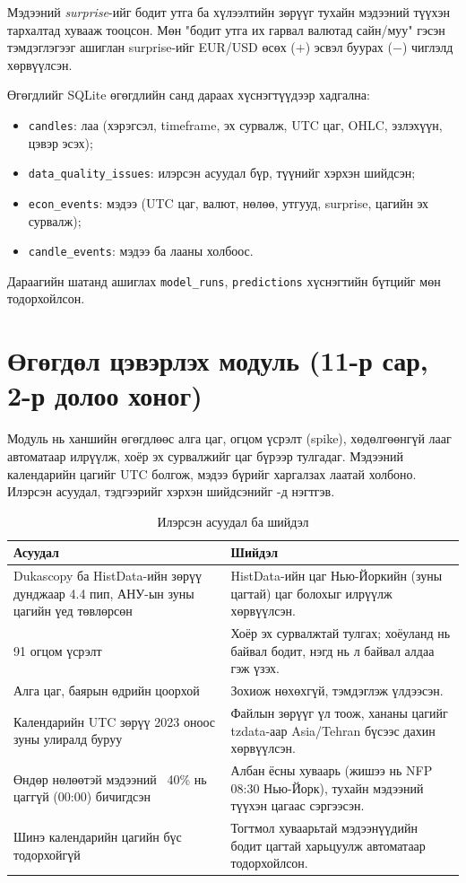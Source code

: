 Мэдээний \emph{surprise}-ийг бодит утга ба хүлээлтийн зөрүүг тухайн мэдээний түүхэн тархалтад хувааж тооцсон. Мөн
"бодит утга их гарвал валютад сайн/муу" гэсэн тэмдэглэгээг ашиглан surprise-ийг EUR/USD өсөх ($+$) эсвэл буурах
($-$) чиглэлд хөрвүүлсэн.

Өгөгдлийг SQLite өгөгдлийн санд дараах хүснэгтүүдээр хадгална:
\begin{itemize}
    \item \texttt{candles}: лаа (хэрэгсэл, timeframe, эх сурвалж, UTC цаг, OHLC, эзлэхүүн, цэвэр эсэх);
    \item \texttt{data\_quality\_issues}: илэрсэн асуудал бүр, түүнийг хэрхэн шийдсэн;
    \item \texttt{econ\_events}: мэдээ (UTC цаг, валют, нөлөө, утгууд, surprise, цагийн эх сурвалж);
    \item \texttt{candle\_events}: мэдээ ба лааны холбоос.
\end{itemize}
Дараагийн шатанд ашиглах \texttt{model\_runs}, \texttt{predictions} хүснэгтийн бүтцийг мөн тодорхойлсон.

\section{Өгөгдөл цэвэрлэх модуль (11-р сар, 2-р долоо хоног)}
Модуль нь ханшийн өгөгдлөөс алга цаг, огцом үсрэлт (spike), хөдөлгөөнгүй лааг автоматаар илрүүлж, хоёр эх сурвалжийг
цаг бүрээр тулгадаг. Мэдээний календарийн цагийг UTC болгож, мэдээ бүрийг харгалзах лаатай холбоно. Илэрсэн асуудал,
тэдгээрийг хэрхэн шийдсэнийг -д нэгтгэв.

\begin{table}[H]
\centering
\caption{Илэрсэн асуудал ба шийдэл}
\label{tab:quality}
\small
\begin{tabular}{p{5.2cm}p{7.6cm}}
\toprule
\textbf{Асуудал} & \textbf{Шийдэл} \\
\midrule
Dukascopy ба HistData-ийн зөрүү дунджаар 4.4 пип, АНУ-ын зуны цагийн үед төвлөрсөн &
HistData-ийн цаг Нью-Йоркийн (зуны цагтай) цаг болохыг илрүүлж хөрвүүлсэн. \\
91 огцом үсрэлт & Хоёр эх сурвалжтай тулгах; хоёуланд нь байвал бодит, нэгд нь л байвал алдаа гэж үзэх. \\
Алга цаг, баярын өдрийн цоорхой & Зохиож нөхөхгүй, тэмдэглэж үлдээсэн. \\
Календарийн UTC зөрүү 2023 оноос зуны улиралд буруу &
Файлын зөрүүг үл тоож, хананы цагийг tzdata-аар Asia/Tehran бүсээс дахин хөрвүүлсэн. \\
Өндөр нөлөөтэй мэдээний ~40\% нь цаггүй (00:00) бичигдсэн &
Албан ёсны хуваарь (жишээ нь NFP 08:30 Нью-Йорк), тухайн мэдээний түүхэн цагаас сэргээсэн. \\
Шинэ календарийн цагийн бүс тодорхойгүй &
Тогтмол хуваарьтай мэдээнүүдийн бодит цагтай харьцуулж автоматаар тодорхойлсон. \\
\bottomrule
\end{tabular}
\end{table}

